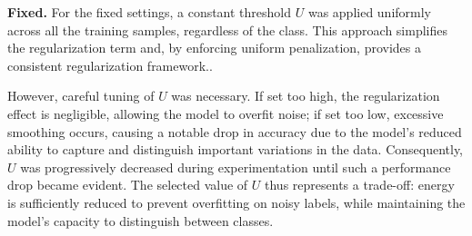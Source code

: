 {\textbf{Fixed.} For the fixed settings, a constant threshold $U$ was applied uniformly across all the training samples, regardless of the class. This approach simplifies the regularization term and, by enforcing uniform penalization, provides a consistent regularization framework.. 

However, careful tuning of $U$ was necessary. If set too high, the regularization effect is negligible, allowing the model to overfit noise; if set too low, excessive smoothing occurs, causing a notable drop in accuracy due to the model’s reduced ability to capture and distinguish important variations in the data. Consequently, $U$ was progressively decreased during experimentation until such a performance drop became evident. The selected value of $U$  thus represents a trade-off: energy is sufficiently reduced to prevent overfitting on noisy labels, while maintaining the model's capacity to distinguish between classes.

}


